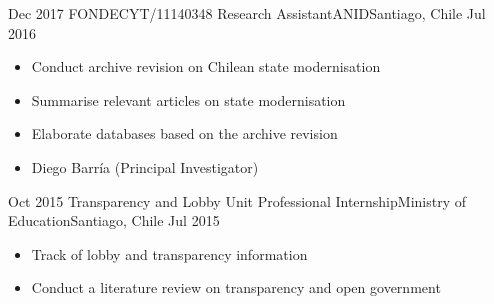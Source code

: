 \begin{experiences}
  \emptySeparator 
  \experience 
    {Dec 2017} {FONDECYT/11140348 Research Assistant}{ANID}{Santiago, Chile} {Jul 2016}
    {\begin{itemize}
    \item Conduct archive revision on Chilean state modernisation
    \item Summarise relevant articles on state modernisation
    \item Elaborate databases based on the archive revision
    \item Diego Barría {\small (Principal Investigator)}
    \end{itemize}}
    {}
\end{experiences}
\vspace{-2mm}

\begin{experiences}
  \emptySeparator 
  \experience 
    {Oct 2015} {Transparency and Lobby Unit Professional Internship}{Ministry of Education}{Santiago, Chile} {Jul 2015}
    {\begin{itemize}
    \item Track of lobby and transparency information
    \item Conduct a literature review on transparency and open government
    \end{itemize}}
    {}
\end{experiences}
\vspace{-2mm}